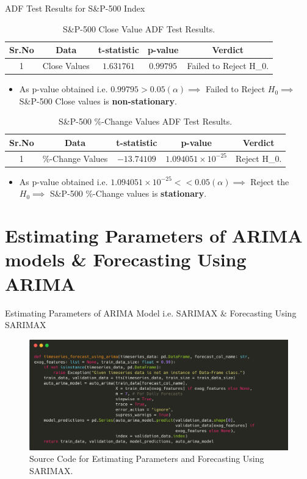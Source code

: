 \documentclass{beamer}
\begin{document}
\begin{frame}{ADF Test Results for S\&P-500 Index}
	\begin{table}
		\begin{tabular}{c{0.5cm} c{1cm} c c c}
			\textbf{Sr.No} & \textbf{Data} & \textbf{t-statistic} & \textbf{p-value} & \textbf{Verdict}        \\
			\midrule
			1              & Close Values  & $1.631761$           & $0.99795$        & Failed to Reject H_{0}. \\
			\bottomrule
		\end{tabular}
		\caption{S\&P-500 Close Value ADF Test Results.}
	\end{table}
	\begin{itemize}
		\item As p-value obtained i.e. $0.99795 > 0.05 (\alpha) \implies$ Failed to Reject $H_{0} \implies$ S\&P-500 Close values is \textbf{non-stationary}.
	\end{itemize}
	\pause
	\begin{table}[]
		\centering
		\begin{tabular}{c c c c c}
			\textbf{Sr.No} & \textbf{Data}    & \textbf{t-statistic} & \textbf{p-value}           & \textbf{Verdict} \\
			\midrule
			1              & \%-Change Values & $-13.74109$          & $1.094051 \times 10^{-25}$ & Reject H_{0}.    
			\bottomrule
		\end{tabular}
		\caption{S\&P-500 \%-Change Values ADF Test Results.}
		\label{tab:my_label}
	\end{table}
	\begin{itemize}
		\item As p-value obtained i.e. $1.094051 \times 10^{-25} << 0.05 (\alpha) \implies$ Reject the $H_{0} \implies$ S\&P-500 \%-Change values is \textbf{stationary}.
	\end{itemize}
\end{frame}

\section{Estimating Parameters of ARIMA models \& Forecasting Using ARIMA}
\begin{frame}{Estimating Parameters of ARIMA Model i.e. SARIMAX \& Forecasting Using SARIMAX}
	\begin{figure}
		\centering
		\includegraphics[width = 0.90 \textwidth]{images/timseries_forecast_using_arima.png}
		\caption{Source Code for Estimating Parameters and Forecasting Using SARIMAX.}
		\label{fig:my_label}
	\end{figure}
\end{frame}
\end{document}
